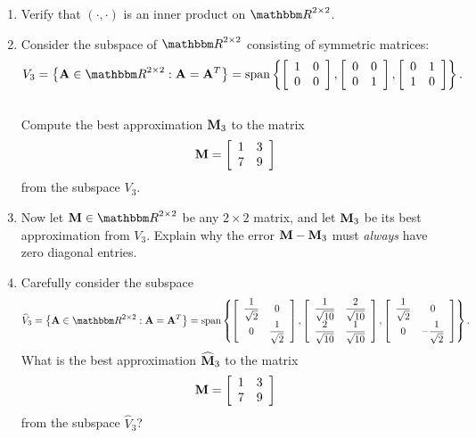 \begin{enumerate}
\item Verify that $(\cdot, \cdot)$ is an inner product on $\R^{2\times 2}$.
\\
\item Consider the subspace of $\R^{2\times 2}$ consisting of symmetric matrices:
      \[  V_3 =\left\{\BA\in \R^{2\times2}:\BA=\BA^T\right\}= {\rm span}\left\{ 
       \left[\begin{array}{cc}1 & 0 \\ 0 & 0\end{array}\right], 
       \left[\begin{array}{cc}0 & 0 \\ 0 & 1\end{array}\right], 
       \left[\begin{array}{cc}0 & 1 \\ 1 & 0\end{array}\right]\right\}.\]
      \\
      Compute the best approximation ${\bf M}_3$ to the matrix
      \[ {\bf M} = \left[\begin{array}{cc}1 & 3 \\ 7 & 9\end{array}\right]\]
      from the subspace $V_3$.
\\
\item Now let $\BM\in\R^{2\times2}$ be any $2\times 2$ matrix, and let
           ${\bf M}_3$ be its best approximation from $V_3$.
           Explain why the error ${\bf M}-{\bf M}_3$ must \emph{always} have zero 
           diagonal entries.
\\
\item Carefully consider the subspace
      \[  \widehat{V}_3 =\left\{\BA\in \R^{2\times2}:\BA=\BA^T\right\}= {\rm span}\left\{ 
       \left[\begin{array}{cc}\displaystyle{{1\over\sqrt{2}}}  & 0 \\ 0 & \displaystyle{{1\over \sqrt{2}}}\end{array}\right], 
       \left[\begin{array}{cc}\displaystyle{{1\over\sqrt{10}}} & \displaystyle{{2\over\sqrt{10}}} \\ \displaystyle{{2\over\sqrt{10}}} & \displaystyle{{1\over \sqrt{10}}}\end{array}\right], 
       \left[\begin{array}{cc}\displaystyle{{1\over\sqrt{2}}} & 0 \\ 0 & \displaystyle{-{1\over\sqrt{2}}}\end{array}\right]\right\}.\]
       What is the best approximation $\widehat{{\bf M}}_3$  to the matrix
      \[ {\bf M} = \left[\begin{array}{cc}1 & 3 \\ 7 & 9\end{array}\right]\]
      from the subspace $\widehat{V}_3$?
\end{enumerate}




